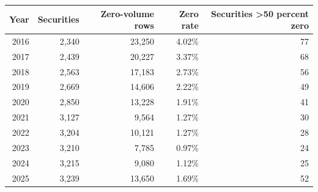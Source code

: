 {\small
\begin{tabular}{@{}rrrrr@{}}
\toprule
Year & Securities & Zero-volume rows & Zero rate & Securities >50 percent zero \\
\midrule
2016 & 2,340 & 23,250 & 4.02\% & 77 \\
2017 & 2,439 & 20,227 & 3.37\% & 68 \\
2018 & 2,563 & 17,183 & 2.73\% & 56 \\
2019 & 2,669 & 14,606 & 2.22\% & 49 \\
2020 & 2,850 & 13,228 & 1.91\% & 41 \\
2021 & 3,127 & 9,564 & 1.27\% & 30 \\
2022 & 3,204 & 10,121 & 1.27\% & 28 \\
2023 & 3,210 & 7,785 & 0.97\% & 24 \\
2024 & 3,215 & 9,080 & 1.12\% & 25 \\
2025 & 3,239 & 13,650 & 1.69\% & 52 \\
\bottomrule
\end{tabular}
}
